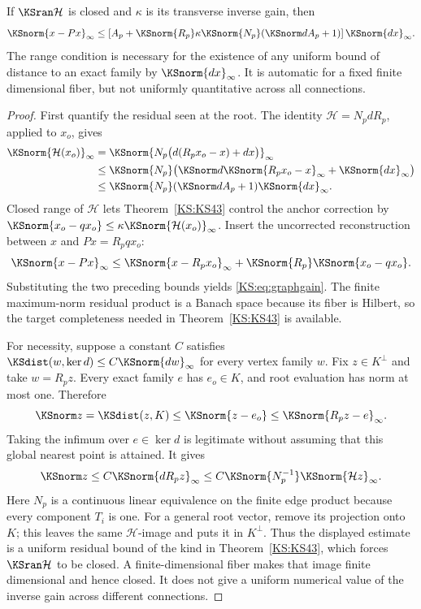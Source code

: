\begin{KStheorem}\label{KS:KS44}
If \(\KSran\mathcal H\) is closed and \(\kappa\) is its transverse inverse gain, then
\begin{equation}\label{KS:eq:graphgain}
 \KSnorm{x-Px}_\infty\le
 \left[A_p+\KSnorm{R_p}\kappa\KSnorm{N_p}(\KSnorm d A_p+1)\right]
 \KSnorm{dx}_\infty.
\end{equation}
The range condition is necessary for the existence of any uniform bound of distance to an exact family by \(\KSnorm{dx}_\infty\). It is automatic for a fixed finite dimensional fiber, but not uniformly quantitative across all connections.
\end{KStheorem}
\begin{proof}
First quantify the residual seen at the root. The identity \(\mathcal H=N_pdR_p\), applied to \(x_o\), gives
\[
 \begin{aligned}
 \KSnorm{\mathcal H(x_o)}_\infty
 &=\KSnorm{N_p\bigl(d(R_px_o-x)+dx\bigr)}_\infty\\
 &\le\KSnorm{N_p}\bigl(\KSnorm d\KSnorm{R_px_o-x}_\infty+\KSnorm{dx}_\infty\bigr)\\
 &\le\KSnorm{N_p}(\KSnorm d A_p+1)\KSnorm{dx}_\infty.
 \end{aligned}
\]
Closed range of \(\mathcal H\) lets Theorem~\ref{KS:KS43} control the anchor correction by
\(\KSnorm{x_o-qx_o}\le\kappa\KSnorm{\mathcal H(x_o)}_\infty\). Insert the uncorrected reconstruction between \(x\) and \(Px=R_pqx_o\):
\[
 \KSnorm{x-Px}_\infty
 \le\KSnorm{x-R_px_o}_\infty+\KSnorm{R_p}\KSnorm{x_o-qx_o}.
\]
Substituting the two preceding bounds yields \eqref{KS:eq:graphgain}. The finite maximum-norm residual product is a Banach space because its fiber is Hilbert, so the target completeness needed in Theorem~\ref{KS:KS43} is available.

For necessity, suppose a constant \(C\) satisfies
\(\KSdist(w,\ker d)\le C\KSnorm{dw}_\infty\) for every vertex family \(w\). Fix \(z\in K^\perp\) and take \(w=R_pz\). Every exact family \(e\) has \(e_o\in K\), and root evaluation has norm at most one. Therefore
\[
 \KSnorm z=\KSdist(z,K)\le\KSnorm{z-e_o}\le\KSnorm{R_pz-e}_\infty.
\]
Taking the infimum over \(e\in\ker d\) is legitimate without assuming that this global nearest point is attained. It gives
\[
 \KSnorm z\le C\KSnorm{dR_pz}_\infty
 \le C\KSnorm{N_p^{-1}}\KSnorm{\mathcal Hz}_\infty.
\]
Here \(N_p\) is a continuous linear equivalence on the finite edge product because every component \(T_i\) is one. For a general root vector, remove its projection onto \(K\); this leaves the same \(\mathcal H\)-image and puts it in \(K^\perp\). Thus the displayed estimate is a uniform residual bound of the kind in Theorem~\ref{KS:KS43}, which forces \(\KSran\mathcal H\) to be closed. A finite-dimensional fiber makes that image finite dimensional and hence closed. It does not give a uniform numerical value of the inverse gain across different connections.
\end{proof}
